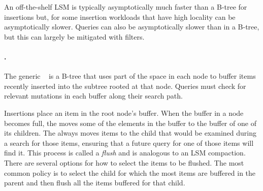 


An off-the-shelf LSM is typically
asymptotically much faster than a B-tree for insertions but, for some
insertion workloads that have high locality can be asymptotically slower.  Queries can also be
asymptotically slower than in a B-tree, but this can largely be
mitigated with filters.

\paragraph{\Bets.} The generic \bet~\cite{DBLP:conf/soda/BrodalF03}
is
a B-tree that uses part of the space in each node to buffer items
recently inserted into the subtree rooted at that node.  Queries must
check for relevant mutations in each buffer along their search path.

Insertions place an item in the root node's buffer.  When the buffer
in a node becomes full, the \bet moves some of the
elements in the buffer to the buffer of one of its children.  The \bet
always moves items to the child that would be examined during a search
for those items, ensuring that a future query for one of those items
will find it. This process is called a \emph{flush} and is analogous
to an LSM compaction.  There are several options for how to select the
items to be flushed.  The most common policy is to select the child
for which the most items are buffered in the parent and then flush
all the items buffered for that child.  

